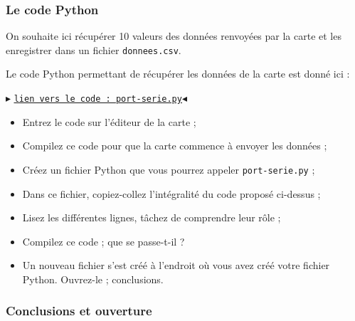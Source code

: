 \documentclass[11pt]{article}
\begin{document}
 
 
 
 \subsubsection{Le code Python}
 
 
 On souhaite ici récupérer 10 valeurs des données renvoyées par la carte et les enregistrer dans un fichier \texttt{donnees.csv}.
 
 \smallskip
 
 Le code Python permettant de récupérer les données de la carte est donné ici : 
 
 
 
\begin{center}
$\blacktriangleright$ \href{https://github.com/formationPythonPC-Juin/corrections-formation/blob/master/port-serie.py}{\underline{\texttt{lien vers le code : port-serie.py}}}$\blacktriangleleft$                                                                                                                                                                    \end{center}

 
 
 \begin{itemize}
  \item Entrez le code sur l'éditeur de la carte ;
  \item Compilez ce code pour que la carte commence à envoyer les données ;
  \item Créez un fichier Python que vous pourrez appeler \texttt{port-serie.py} ; 
  \item Dans ce fichier, copiez-collez l'intégralité du code proposé ci-dessus  ;
  \item Lisez les différentes lignes, tâchez de comprendre leur rôle ;
  \item Compilez ce code ; que se passe-t-il ?
  \item Un nouveau fichier s'est créé à l'endroit où vous avez créé votre fichier Python. Ouvrez-le ; conclusions.
 \end{itemize}

 
 
 
 
 \subsubsection{Conclusions et ouverture}
 
\end{document}
